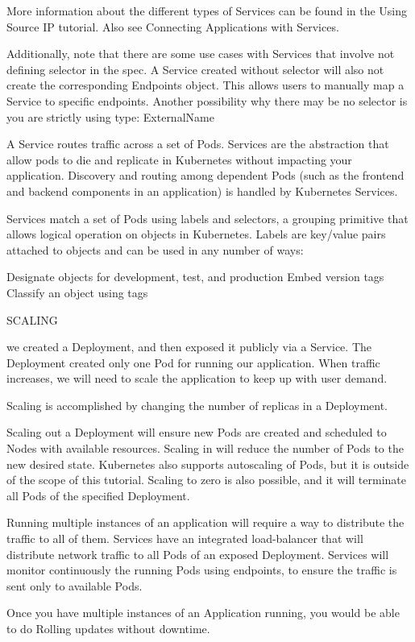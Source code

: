 More information about the different types of Services can be found in the Using Source IP tutorial. Also see Connecting Applications with Services.

Additionally, note that there are some use cases with Services that involve not defining selector in the spec. A Service created without selector will also not create the corresponding Endpoints object. This allows users to manually map a Service to specific endpoints. Another possibility why there may be no selector is you are strictly using type: ExternalName

A Service routes traffic across a set of Pods. Services are the abstraction that allow pods to die and replicate in Kubernetes without impacting your application. Discovery and routing among dependent Pods (such as the frontend and backend components in an application) is handled by Kubernetes Services.

Services match a set of Pods using labels and selectors, a grouping primitive that allows logical operation on objects in Kubernetes. Labels are key/value pairs attached to objects and can be used in any number of ways:

Designate objects for development, test, and production
Embed version tags
Classify an object using tags

SCALING

we created a Deployment, and then exposed it publicly via a Service. The Deployment created only one Pod for running our application. When traffic increases, we will need to scale the application to keep up with user demand.

Scaling is accomplished by changing the number of replicas in a Deployment.

Scaling out a Deployment will ensure new Pods are created and scheduled to Nodes with available resources. Scaling in will reduce the number of Pods to the new desired state. Kubernetes also supports autoscaling of Pods, but it is outside of the scope of this tutorial. Scaling to zero is also possible, and it will terminate all Pods of the specified Deployment.

Running multiple instances of an application will require a way to distribute the traffic to all of them. Services have an integrated load-balancer that will distribute network traffic to all Pods of an exposed Deployment. Services will monitor continuously the running Pods using endpoints, to ensure the traffic is sent only to available Pods.

Once you have multiple instances of an Application running, you would be able to do Rolling updates without downtime.


